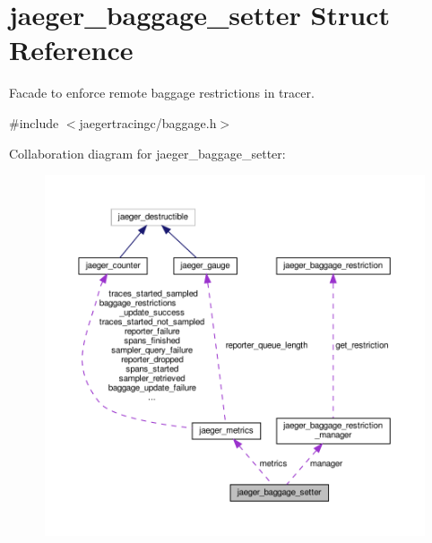 \hypertarget{structjaeger__baggage__setter}{}\section{jaeger\+\_\+baggage\+\_\+setter Struct Reference}
\label{structjaeger__baggage__setter}


Facade to enforce remote baggage restrictions in tracer.  




{\ttfamily \#include $<$jaegertracingc/baggage.\+h$>$}



Collaboration diagram for jaeger\+\_\+baggage\+\_\+setter\+:\nopagebreak
\begin{figure}[H]
\begin{center}
\leavevmode
\includegraphics[width=350pt]{structjaeger__baggage__setter__coll__graph}
\end{center}
\end{figure}
